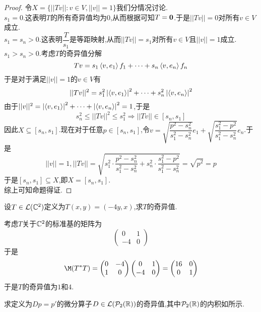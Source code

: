 \documentclass{ctexart}
\begin{document}
\begin{proof}
    令$X=\{||Tv||:v\in V,||v||=1\}$我们分情况讨论.\\
    $s_1=0$.这表明$T$的所有奇异值均为$0$,从而根据可知$T=\mathbf0$.于是$||Tv||=0$对所有$v\in V$成立.\\
    $s_1=s_n>0$.这表明$\dfrac{T}{s_1}$是等距映射,从而$||Tv||=s_1$对所有$v\in V$且$||v||=1$成立.\\
    $s_1>s_n>0$.考虑$T$的奇异值分解
    \[Tv=s_1\left\langle{v},{e_1}\right\rangle f_1+\cdots+s_n\left\langle{v},{e_n}\right\rangle f_n\]
    于是对于满足$||v||=1$的$v\in V$有
    \[||Tv||^2=s_1^2\left|\left\langle{v},{e_1}\right\rangle\right|^2+\cdots+s_n^2\left|\left\langle{v},{e_n}\right\rangle\right|^2\]
    由于$||v||^2=\left|\left\langle{v},{e_1}\right\rangle\right|^2+\cdots+\left|\left\langle{v},{e_n}\right\rangle\right|^2=1$,于是
    \[s_n^2\leqslant||Tv||^2\leqslant s_1^2\Rightarrow ||Tv||\in[s_n,s_1]\]
    因此$X\subseteq[s_n,s_1]$.现在对于任意$p\in[s_n,s_1]$,令$v=\sqrt{\dfrac{p^2-s_n^2}{s_1^2-s_n^2}}e_1+\sqrt{\dfrac{s_1^2-p^2}{s_1^2-s_n^2}}e_n$.于是
    \[||v||=1,||Tv||=\sqrt{s_1^2\cdot\dfrac{p^2-s_n^2}{s_1^2-s_n^2}+s_n^2\cdot\dfrac{s_1^2-p^2}{s_1^2-s_n^2}}=\sqrt{p^2}=p\]
    于是$[s_n,s_1]\subseteq X$,即$X=[s_n,s_1]$.\\
    综上可知命题得证.
\end{proof}
\begin{problem}[5.]
    设$T\in\mathcal{L}(\mathbb{C}^2)$定义为$T(x,y)=(-4y,x)$,求$T$的奇异值.
\end{problem}
\begin{solution}
    考虑$T$关于$\mathbb{C}^2$的标准基的矩阵为
    \[\begin{pmatrix}
        0&1\\-4&0
    \end{pmatrix}\]
    于是
    \[\M(T^*T)=\begin{pmatrix}
        0&-4\\1&0
    \end{pmatrix}\begin{pmatrix}
        0&1\\-4&0
    \end{pmatrix}=\begin{pmatrix}
        16&0\\0&1
    \end{pmatrix}\]
    于是$T$的奇异值为$1$和$4$.
\end{solution}
\begin{problem}[6.]
    求定义为$Dp=p'$的微分算子$D\in\mathcal{L}(\mathcal{P}_2(\mathbb{R}))$的奇异值,其中$\mathcal{P}_2(\mathbb{R})$的内积如所示.
\end{problem}
\end{document}
